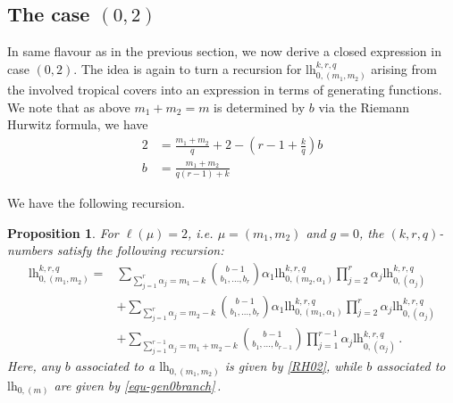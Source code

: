 \documentclass[10pt,a4paper,oneside,no-math,reqno]{amsart}%
\theoremstyle{plain}
\newtheorem{proposition}[theorem]{Proposition}
\theoremstyle{definition}
\theoremstyle{remark}
\numberwithin{equation}{section}
\newcommand{\1}{\mathds{1}}
\newcommand{\<}{\langle}
\renewcommand{\>}{\rangle}
\newcommand{\lh}{\mathord{\mathrm{l\!h}}}
\begin{document}

\subsection{The case \texorpdfstring{$(0,2)$}{(0,2)}}
In same flavour as in the previous section, we now derive a closed expression in case $(0,2)$. The idea is again to turn a recursion for $\lh_{0,(m_1,m_2)}^{k,r,q}$ arising from the involved tropical covers into an expression in terms of generating functions. We note that as above $m_1+m_2=m$ is determined by $b$ via the Riemann Hurwitz formula, we have 
\begin{equation}\label{RH02}
    \begin{split}
    	2
    	&=
    	\frac{m_1+m_2}{q}+2-(r-1+\frac{k}{q})b
    	\\
    	b
    	&=
    	\frac{m_1+m_2}{q(r-1)+k}
    \end{split}
\end{equation}


We have the following recursion.

\begin{proposition}
\label{prop-rec02}
  For $\ell(\mu)=2$, i.e. $\mu=(m_1,m_2)$ and $g=0$, the $(k,r,q)$-numbers satisfy the following recursion:
	\begin{equation} \label{Rec02}
    \begin{split}
       \lh_{0,(m_1,m_2)}^{k,r,q}
       =&
       \sum_{\sum_{j=1}^{r} \alpha_j=m_1-k} \binom{b-1}{b_1,\dots,b_{r}} \alpha_1 \lh_{0,(m_2,\alpha_1)}^{k,r,q} \prod_{j=2}^{r} \alpha_j \lh_{0,(\alpha_j)}^{k,r,q}\\
       &+
       \sum_{\sum_{j=1}^{r} \alpha_j=m_2-k} \binom{b-1}{b_1,\dots,b_{r}} \alpha_1 \lh_{0,(m_1,\alpha_1)}^{k,r,q} \prod_{j=2}^{r} \alpha_j \lh_{0,(\alpha_j)}^{k,r,q}\\
       &+
       \sum_{\sum_{j=1}^{r-1} \alpha_j = m_1 + m_2 - k} \binom{b-1}{b_1, \dotsc, b_{r-1}} \prod_{j = 1}^{r-1} \alpha_j \lh_{0,(\alpha_j)}^{k,r,q}\,.
    \end{split}
    \end{equation}
    Here, any $ b $ associated to a $ \lh_{0,(m_1,m_2)}$ is given by \cref{RH02}, while $ b $ associated to $ \lh_{0,(m)}$ are given by \cref{equ-gen0branch}\,.
\end{proposition}
\end{document}
